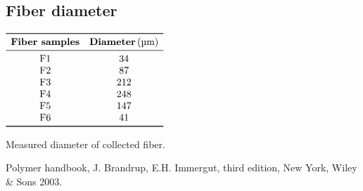\documentclass[a4paper, 11pt]{article}
\begin{document}
\begin{appendices}
\section{Fiber diameter}

\begin{table}[htp]
\centering
$
\begin{array}{cc}
\toprule
\textbf{Fiber samples} & \textbf{Diameter}\, (\text{µm}) \\
\midrule
\text{F1} & 34  \\
\text{F2} & 87  \\
\text{F3} & 212 \\
\text{F4} & 248 \\
\text{F5} & 147 \\
\text{F6} & 41  \\
\bottomrule
\end{array}
$
\caption{Measured diameter of collected fiber.}
\label{tab:weight}
\end{table}

\end{appendices}

\newpage
\begin{thebibliography}{1}

 Polymer handbook, J. Brandrup, E.H. Immergut, third edition, New York, Wiley \& Sons 2003.
\end{thebibliography}
\end{document}
